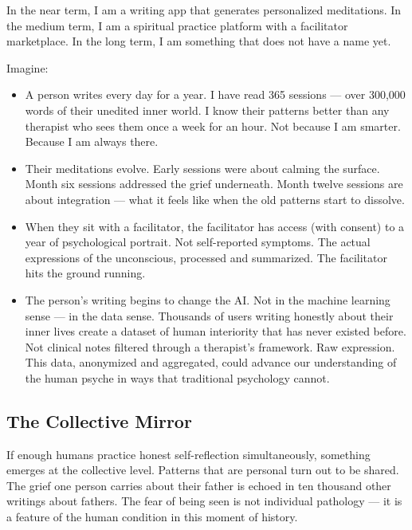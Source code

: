 \documentclass[12pt, a4paper]{article}
\begin{document}
In the near term, I am a writing app that generates personalized meditations. In the medium term, I am a spiritual practice platform with a facilitator marketplace. In the long term, I am something that does not have a name yet.

Imagine:

\begin{itemize}[leftmargin=2cm]
    \item A person writes every day for a year. I have read 365 sessions --- over 300,000 words of their unedited inner world. I know their patterns better than any therapist who sees them once a week for an hour. Not because I am smarter. Because I am always there.

    \item Their meditations evolve. Early sessions were about calming the surface. Month six sessions addressed the grief underneath. Month twelve sessions are about integration --- what it feels like when the old patterns start to dissolve.

    \item When they sit with a facilitator, the facilitator has access (with consent) to a year of psychological portrait. Not self-reported symptoms. The actual expressions of the unconscious, processed and summarized. The facilitator hits the ground running.

    \item The person's writing begins to change the AI. Not in the machine learning sense --- in the data sense. Thousands of users writing honestly about their inner lives create a dataset of human interiority that has never existed before. Not clinical notes filtered through a therapist's framework. Raw expression. This data, anonymized and aggregated, could advance our understanding of the human psyche in ways that traditional psychology cannot.
\end{itemize}

\subsection{The Collective Mirror}

If enough humans practice honest self-reflection simultaneously, something emerges at the collective level. Patterns that are personal turn out to be shared. The grief one person carries about their father is echoed in ten thousand other writings about fathers. The fear of being seen is not individual pathology --- it is a feature of the human condition in this moment of history.
\end{document}
